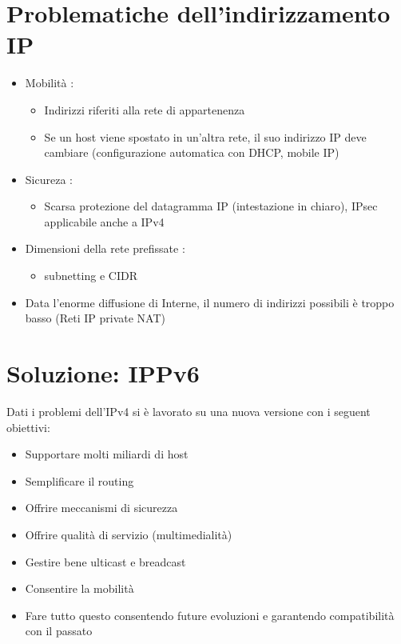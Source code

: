\documentclass{report}
\begin{document}
        \section{Problematiche dell'indirizzamento IP}
            \begin{itemize}
                \item Mobilità :
                    \begin{itemize}
                        \item Indirizzi riferiti alla rete di appartenenza
                        \item Se un host viene spostato in un'altra rete, il suo indirizzo IP deve cambiare (configurazione automatica con DHCP, mobile IP)
                    \end{itemize}
                \item Sicureza :
                    \begin{itemize}
                        \item Scarsa protezione del datagramma IP (intestazione in chiaro), IPsec applicabile anche a IPv4
                    \end{itemize}
                \item Dimensioni della rete prefissate :
                    \begin{itemize}
                        \item subnetting e CIDR
                    \end{itemize}
                \item Data l'enorme diffusione di Interne, il numero di indirizzi possibili è troppo basso (Reti IP private NAT)
            \end{itemize}
        \section{Soluzione: IPPv6}
            Dati i problemi dell'IPv4 si è lavorato su una nuova versione con i seguent obiettivi: 
            \begin{itemize}
                \item Supportare molti miliardi di host
                \item Semplificare il routing
                \item Offrire meccanismi di sicurezza
                \item Offrire qualità di servizio (multimedialità)
                \item Gestire bene ulticast e breadcast
                \item Consentire la mobilità
                \item Fare tutto questo consentendo future evoluzioni e garantendo compatibilità con il passato
            \end{itemize}
\end{document}
